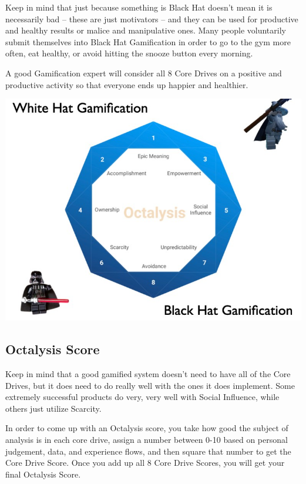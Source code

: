 \documentclass[
]{book}
\begin{document}
Keep in mind that just because something is Black Hat doesn't mean it is necessarily bad -- these are just motivators -- and they can be used for productive and healthy results or malice and manipulative ones. Many people voluntarily submit themselves into Black Hat Gamification in order to go to the gym more often, eat healthy, or avoid hitting the snooze button every morning.

A good Gamification expert will consider all 8 Core Drives on a positive and productive activity so that everyone ends up happier and healthier.

\begin{center}\includegraphics[width=0.9\linewidth]{assets/images/White-Hat-vs-Black-Hat-Gamification} \end{center}

\hypertarget{octalysis-score}{%
\subsection{Octalysis Score}\label{octalysis-score}}

Keep in mind that a good gamified system doesn't need to have all of the Core Drives, but it does need to do really well with the ones it does implement. Some extremely successful products do very, very well with Social Influence, while others just utilize Scarcity.

In order to come up with an Octalysis score, you take how good the subject of analysis is in each core drive, assign a number between 0-10 based on personal judgement, data, and experience flows, and then square that number to get the Core Drive Score. Once you add up all 8 Core Drive Scores, you will get your final Octalysis Score.
\end{document}
